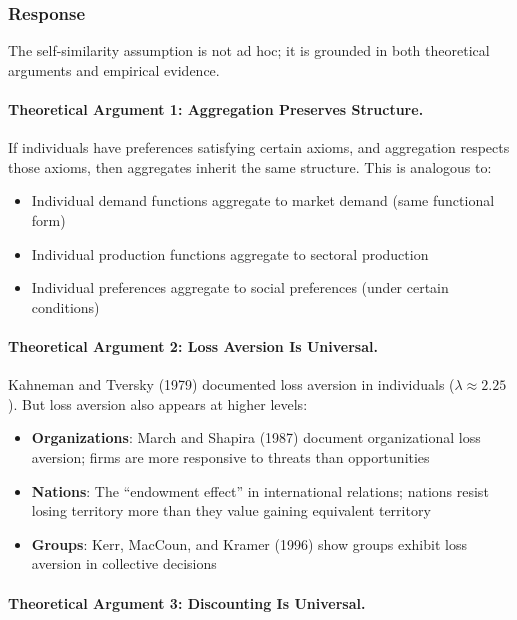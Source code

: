 \documentclass[12pt,a4paper]{article}
\begin{document}
\subsubsection{Response}

The self-similarity assumption is not ad hoc; it is grounded in both theoretical 
arguments and empirical evidence.

\paragraph{Theoretical Argument 1: Aggregation Preserves Structure.}

If individuals have preferences satisfying certain axioms, and aggregation 
respects those axioms, then aggregates inherit the same structure. This is 
analogous to:
\begin{itemize}[nosep]
\item Individual demand functions aggregate to market demand (same functional form)
\item Individual production functions aggregate to sectoral production
\item Individual preferences aggregate to social preferences (under certain conditions)
\end{itemize}

\paragraph{Theoretical Argument 2: Loss Aversion Is Universal.}

Kahneman and Tversky (1979) documented loss aversion in individuals ($\lambda \approx 2.25$). 
But loss aversion also appears at higher levels:
\begin{itemize}[nosep]
\item \textbf{Organizations}: March and Shapira (1987) document organizational loss aversion; 
firms are more responsive to threats than opportunities
\item \textbf{Nations}: The ``endowment effect'' in international relations; 
nations resist losing territory more than they value gaining equivalent territory
\item \textbf{Groups}: Kerr, MacCoun, and Kramer (1996) show groups exhibit loss aversion in 
collective decisions
\end{itemize}

\paragraph{Theoretical Argument 3: Discounting Is Universal.}
\end{document}
